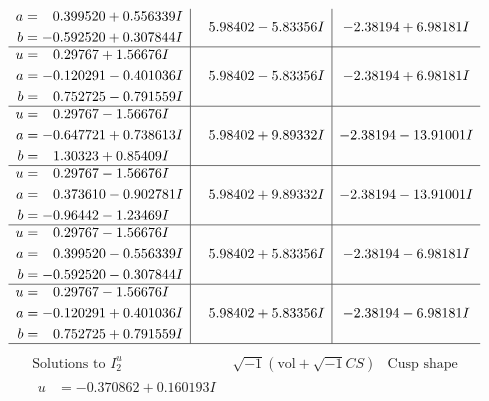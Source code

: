 \documentclass[1p]{elsarticle_modified}
\theoremstyle{definition}
\newcommand{\I}{\sqrt{-1}}
\begin{document}
$$\begin{array}{c|c|c}
\begin{aligned}
a &= \phantom{-}0.399520 + 0.556339 I \\
b &= -0.592520 + 0.307844 I\end{aligned}
 & \phantom{-}5.98402 - 5.83356 I & -2.38194 + 6.98181 I \\ \hline\begin{aligned}
u &= \phantom{-}0.29767 + 1.56676 I \\
a &= -0.120291 - 0.401036 I \\
b &= \phantom{-}0.752725 - 0.791559 I\end{aligned}
 & \phantom{-}5.98402 - 5.83356 I & -2.38194 + 6.98181 I \\ \hline\begin{aligned}
u &= \phantom{-}0.29767 - 1.56676 I \\
a &= -0.647721 + 0.738613 I \\
b &= \phantom{-}1.30323 + 0.85409 I\end{aligned}
 & \phantom{-}5.98402 + 9.89332 I & -2.38194 - 13.91001 I \\ \hline\begin{aligned}
u &= \phantom{-}0.29767 - 1.56676 I \\
a &= \phantom{-}0.373610 - 0.902781 I \\
b &= -0.96442 - 1.23469 I\end{aligned}
 & \phantom{-}5.98402 + 9.89332 I & -2.38194 - 13.91001 I \\ \hline\begin{aligned}
u &= \phantom{-}0.29767 - 1.56676 I \\
a &= \phantom{-}0.399520 - 0.556339 I \\
b &= -0.592520 - 0.307844 I\end{aligned}
 & \phantom{-}5.98402 + 5.83356 I & -2.38194 - 6.98181 I \\ \hline\begin{aligned}
u &= \phantom{-}0.29767 - 1.56676 I \\
a &= -0.120291 + 0.401036 I \\
b &= \phantom{-}0.752725 + 0.791559 I\end{aligned}
 & \phantom{-}5.98402 + 5.83356 I & -2.38194 - 6.98181 I\\
 \hline 
 \end{array}$$\newpage$$\begin{array}{c|c|c}  
\text{Solutions to }I^u_{2}& \I (\text{vol} + \sqrt{-1}CS) & \text{Cusp shape}\\
 \hline 
\begin{aligned}
u &= -0.370862 + 0.160193 I \\

\end{aligned}
\end{array}$$
\end{document}
